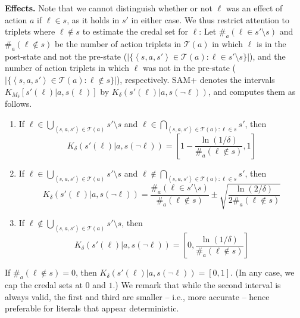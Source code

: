 \documentclass[letterpaper]{article} %
\newcommand{\tuple}[1]{\ensuremath{\left \langle #1 \right \rangle }}
\begin{document}
\noindent \textbf{Effects.} 
Note that we cannot distinguish whether or not $\ell$ was an effect of action $a$ if $\ell\in s$, as it holds in $s'$ in either case. We thus restrict attention to triplets where $\ell\notin s$ to estimate the credal set for $\ell$: 
Let $\#_a(\ell\in s'\setminus s)$ and $\#_a(\ell\notin s)$ 
be the number of action triplets in $\mathcal{T}(a)$ in which $\ell$ is in the post-state and not the pre-state ($|\{\tuple{s, a, s'}\in \mathcal{T}(a):\ell\in s'\setminus s\}|$), 
and the number of action triplets in which $\ell$ was not in the pre-state 
($|\{\tuple{s, a, s'}\in \mathcal{T}(a):\ell\notin s\}|$), respectively. 
SAM+ denotes the intervals $K_{M_\delta}[s'(\ell)|a,s(\ell)]$ 
by $K_\delta(s'(\ell)|a,s(\neg \ell))$, and computes them as follows.
\begin{enumerate}
\item If $\ell \in \bigcup_{\tuple{s, a, s'}\in \mathcal{T}(a)} s'\setminus s$ and $\ell \in \bigcap_{\tuple{s, a, s'}\in \mathcal{T}(a):\ell\in s}s'$, 
then 
\begin{equation}
    K_\delta(s'(\ell)|a,s(\neg \ell)) = \left[1-\frac{\ln(1/\delta)}{\#_a(\ell\notin s)},1\right]
    \label{eq:det-effects}
\end{equation}
    \item If $\ell \in \bigcup_{\tuple{s, a, s'}\in \mathcal{T}(a)} s'\setminus s$ and $\ell \notin \bigcap_{\tuple{s, a, s'}\in \mathcal{T}(a):\ell\in s}s'$, 
then 
\begin{equation}
    K_\delta(s'(\ell)|a,s(\neg \ell)) = \frac{\#_a(\ell\in s'\setminus s)}{\#_a(\ell\notin s)} \pm\sqrt{\frac{\ln(2/\delta)}{2\#_a(\ell\notin s)}}
    \label{eq:present-effects}
\end{equation}
\item If $\ell\notin\bigcup_{\tuple{s, a, s'}\in \mathcal{T}(a)} s'\setminus s$, then 
\begin{equation}
    K_\delta(s'(\ell)|a,s(\neg \ell)) = \left[0,\frac{\ln(1/\delta)}{\#_a(\ell\notin s)}\right]
    \label{eq:missing-effects}
\end{equation}
\end{enumerate}
If $\#_a(\ell\notin s)=0$, then $K_\delta(s'(\ell)|a,s(\neg\ell))=[0,1]$. (In any case, we cap the credal sets at $0$ and $1$.) We remark that while the second interval is always valid, the first and third are smaller -- i.e., more accurate -- hence preferable for literals that appear deterministic.


\end{document}
